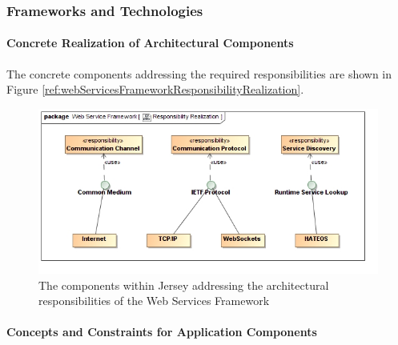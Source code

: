 \subsubsection{Frameworks and Technologies}
\paragraph{Concrete Realization of Architectural Components}
The concrete components addressing the required responsibilities are shown in Figure \ref{ref:webServicesFrameworkResponsibilityRealization}.
\begin{figure}[H]
	\begin{center}
	\includegraphics[scale=0.5]{../Diagrams and Charts/Web Services Framework/ResponsibilityRealization.jpg}
	\caption{The components within Jersey addressing the architectural responsibilities of the Web Services Framework}
	\label{fig:webServicesFrameworkResponsibilityRealization}
	\end{center}
\end{figure}

\paragraph{Concepts and Constraints for Application Components}